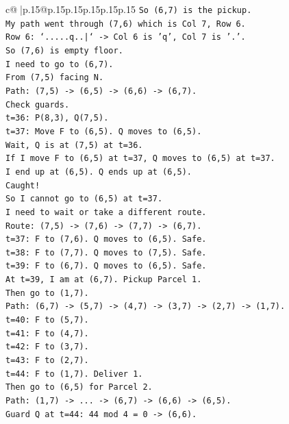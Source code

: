 \documentclass{article}
\begin{document}
{\begin{supertabular}{c@{$\;$}|p{.15\linewidth}@{}p{.15\linewidth}p{.15\linewidth}p{.15\linewidth}p{.15\linewidth}p{.15\linewidth}}
{{{\texttt{So (6,7) is the pickup.} \\
\texttt{My path went through (7,6) which is Col 7, Row 6.} \\
\texttt{Row 6: `.....q..|` {-}> Col 6 is 'q', Col 7 is '.'.} \\
\texttt{So (7,6) is empty floor.} \\
\texttt{I need to go to (6,7).} \\
\texttt{From (7,5) facing N.} \\
\texttt{Path: (7,5) {-}> (6,5) {-}> (6,6) {-}> (6,7).} \\
\texttt{Check guards.} \\
\texttt{t=36: P(8,3), Q(7,5).} \\
\texttt{t=37: Move F to (6,5). Q moves to (6,5).} \\
\texttt{Wait, Q is at (7,5) at t=36.} \\
\texttt{If I move F to (6,5) at t=37, Q moves to (6,5) at t=37.} \\
\texttt{I end up at (6,5). Q ends up at (6,5).} \\
\texttt{Caught!} \\
\texttt{So I cannot go to (6,5) at t=37.} \\
\texttt{I need to wait or take a different route.} \\
\texttt{Route: (7,5) {-}> (7,6) {-}> (7,7) {-}> (6,7).} \\
\texttt{t=37: F to (7,6). Q moves to (6,5). Safe.} \\
\texttt{t=38: F to (7,7). Q moves to (7,5). Safe.} \\
\texttt{t=39: F to (6,7). Q moves to (6,5). Safe.} \\
\texttt{At t=39, I am at (6,7). Pickup Parcel 1.} \\
\texttt{Then go to (1,7).} \\
\texttt{Path: (6,7) {-}> (5,7) {-}> (4,7) {-}> (3,7) {-}> (2,7) {-}> (1,7).} \\
\texttt{t=40: F to (5,7).} \\
\texttt{t=41: F to (4,7).} \\
\texttt{t=42: F to (3,7).} \\
\texttt{t=43: F to (2,7).} \\
\texttt{t=44: F to (1,7). Deliver 1.} \\
\texttt{Then go to (6,5) for Parcel 2.} \\
\texttt{Path: (1,7) {-}> ... {-}> (6,7) {-}> (6,6) {-}> (6,5).} \\
\texttt{Guard Q at t=44: 44 mod 4 = 0 {-}> (6,6).} \\
}}}
\end{supertabular}}
\end{document}
